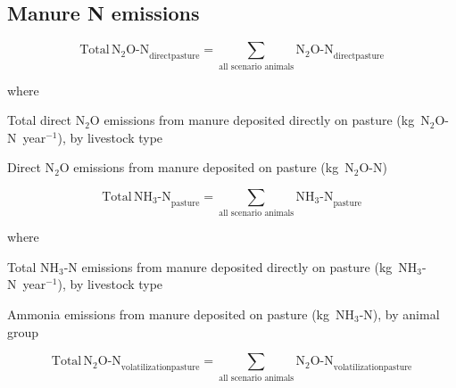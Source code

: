 \subsection{Manure N emissions}
\label{subsec:grazing-total-n}

\begin{equation}
    \mathrm{Total\,N_2O\text{-}N}_{\mathrm{directpasture}}
        = \sum_{\text{all scenario animals}}
          \mathrm{N_2O\text{-}N}_{\mathrm{directpasture}}
    \tag{Eq.\ 5.5.2-1}
\end{equation}

\noindent where

\begin{description}[font=\normalfont, leftmargin=12em, style=nextline, nosep]
    \item[$\mathrm{Total\,N_2O\text{-}N}_{\mathrm{directpasture}}$]
        Total direct N$_2$O emissions from manure deposited directly on pasture
        (kg~N$_2$O-N~year$^{-1}$), by livestock type
    \item[$\mathrm{N_2O\text{-}N}_{\mathrm{directpasture}}$]
        Direct N$_2$O emissions from manure deposited on pasture (kg~N$_2$O-N)
\end{description}

\begin{equation}
    \mathrm{Total\,NH_3\text{-}N}_{\mathrm{pasture}}
        = \sum_{\text{all scenario animals}} \mathrm{NH_3\text{-}N}_{\mathrm{pasture}}
    \tag{Eq.\ 5.5.2-2}
\end{equation}

\noindent where

\begin{description}[font=\normalfont, leftmargin=12em, style=nextline, nosep]
    \item[$\mathrm{Total\,NH_3\text{-}N}_{\mathrm{pasture}}$]
        Total NH$_3$-N emissions from manure deposited directly on pasture
        (kg~NH$_3$-N~year$^{-1}$), by livestock type
    \item[$\mathrm{NH_3\text{-}N}_{\mathrm{pasture}}$]
        Ammonia emissions from manure deposited on pasture (kg~NH$_3$-N), by
        animal group
\end{description}

\begin{equation}
    \mathrm{Total\,N_2O\text{-}N}_{\mathrm{volatilizationpasture}}
        = \sum_{\text{all scenario animals}}
          \mathrm{N_2O\text{-}N}_{\mathrm{volatilizationpasture}}
    \tag{Eq.\ 5.5.2-3}
\end{equation}

